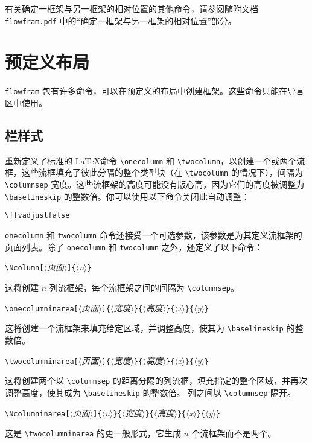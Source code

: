 \documentclass[a4paper]{book}%
\newcommand{\sty}[1]{\texttt{#1}}
\newcommand{\filename}[1]{\texttt{#1}}
\newcommand{\meta}[1]{\textnormal{\ensuremath{\langle}\makebox[0pt][l]{}\emph{#1}\makebox[0pt][l]{}\ensuremath{\rangle}}}
\begin{document}
有关确定一框架与另一框架的相对位置的其他命令，请参阅随附文档 \filename{flowfram.pdf} 中的“确定一框架与另一框架的相对位置”部分。
\chapter{预定义布局}\label{chap-5}%
\sty{flowfram} 包有许多命令，可以在预定义的布局中创建框架。这些命令只能在导言区中使用。
\section{栏样式}\label{sec-5-1}%
重新定义了标准的 \LaTeX 命令 \verb|\onecolumn| 和 \verb|\twocolumn|，以创建一个或两个流框，这些流框填充了彼此分隔的整个类型块（在 \verb|\twocolumn| 的情况下），间隔为 \verb|\columnsep| 宽度。这些流框架的高度可能没有版心高，因为它们的高度被调整为 \verb|\baselineskip| 的整数倍。你可以使用以下命令关闭此自动调整：
\begin{mdframed}
    \verb|\ffvadjustfalse|
\end{mdframed}

\verb|onecolumn| 和 \verb|twocolumn| 命令还接受一个可选参数，该参数是为其定义流框架的页面列表。除了 \verb|onecolumn| 和 \verb|twocolumn| 之外，还定义了以下命令：
\begin{mdframed}
    \verb|\Ncolumn[|\meta{页面}\verb|]{|\meta{n}\verb|}|
\end{mdframed}
这将创建 $n$ 列流框架，每个流框架之间的间隔为 \verb|\columnsep|。
\begin{mdframed}
    \verb|\onecolumninarea[|\meta{页面}\verb|]{|\meta{宽度}\verb|}{|\meta{高度}\verb|}{|\meta{x}\verb|}{|\meta{y}\verb|}|
\end{mdframed}
这将创建一个流框架来填充给定区域，并调整高度，使其为 \verb|\baselineskip| 的整数倍。
\begin{mdframed}
    \verb|\twocolumninarea[|\meta{页面}\verb|]{|\meta{宽度}\verb|}{|\meta{高度}\verb|}{|\meta{x}\verb|}{|\meta{y}\verb|}|
\end{mdframed}
这将创建两个以 \verb|\columnsep| 的距离分隔的列流框，填充指定的整个区域，并再次调整高度，使其成为 \verb|\baselineskip| 的整数倍。 列之间以 \verb|\columnsep| 隔开。
\begin{mdframed}
    \verb|\Ncolumninarea[|\meta{页面}\verb|]{|\meta{n}\verb|}{|\meta{宽度}\verb|}{|\meta{高度}\verb|}{|\meta{x}\verb|}{|\meta{y}\verb|}|
\end{mdframed}
这是 \verb|\twocolumninarea| 的更一般形式，它生成 $n$ 个流框架而不是两个。
\end{document}
